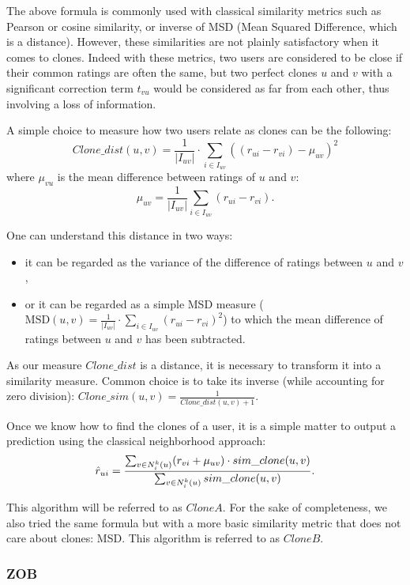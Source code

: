 The above formula is commonly used with classical similarity metrics such as
Pearson or cosine similarity, or inverse of MSD (Mean Squared Difference, which is
a distance).
However, these similarities are not plainly satisfactory when it comes to
clones. Indeed with these metrics, two users are considered to be close if
their common ratings are often the same, but two perfect clones $u$ and $v$
with a significant correction term $t_{vu}$ would be considered as far from
each other, thus involving a loss of information.

A simple choice to measure how two users relate as clones can be the following:
$$Clone\_dist(u, v) =  \frac{1}{|I_{uv}|} \cdot \sum\limits_{i \in I_{uv}}
((r_{ui} - r_{vi}) - \mu_{uv})^2$$
where $\mu_{vu}$ is the mean difference between ratings of $u$ and $v$:
$$\mu_{uv}= \frac{1}{|I_{uv}|}\sum_{i \in I_{uv}} (r_{ui} - r_{vi}).$$

One can understand this distance in two ways:
\begin{itemize}
\item it can be regarded as the variance of the difference of ratings between
  $u$ and $v$,
\item or it can be regarded as a simple MSD measure ($\text{MSD}(u, v) =
  \frac{1}{|I_{uv}|} \cdot \sum\limits_{i \in I_{uv}}
  (r_{ui} - r_{vi})^2$)
 to which the mean difference of ratings between $u$ and $v$ has been
 subtracted.
  \end{itemize}

As our measure $Clone\_dist$ is a distance, it is necessary to transform it
into a similarity measure. Common choice is to take its inverse (while accounting for zero division): $Clone\_sim(u,
v) = \frac{1}{Clone\_dist(u, v) + 1}$.

Once we know how to find the clones of a user, it is a simple matter to output
a prediction using the classical neighborhood approach:
$$\hat{r}_{ui} = \frac{\sum_{v \in N_i^k(u)} (r_{vi} + \mu_{uv}) \cdot sim\_clone(u,
v)}{\sum_{v \in N_i^k(u)} sim\_clone(u, v)}.$$

This algorithm will be referred to as $CloneA$. For the sake of completeness,
we also tried the same formula but with a more basic similarity metric that
does not care about clones: MSD. This algorithm is referred to as $CloneB$.

\subsubsection{ZOB}

